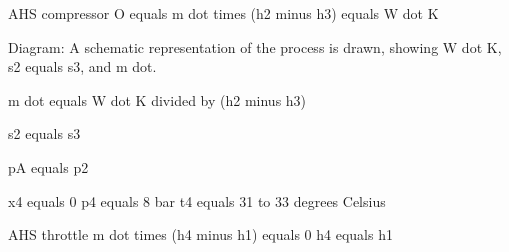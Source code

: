 AHS compressor  
O equals m dot times (h2 minus h3) equals W dot K  

Diagram: A schematic representation of the process is drawn, showing W dot K, s2 equals s3, and m dot.  

m dot equals W dot K divided by (h2 minus h3)  

s2 equals s3  

pA equals p2  

x4 equals 0  
p4 equals 8 bar  
t4 equals 31 to 33 degrees Celsius  

AHS throttle  
m dot times (h4 minus h1) equals 0  
h4 equals h1
